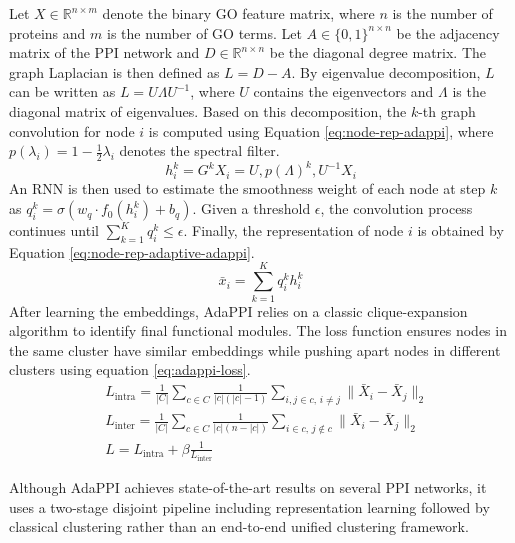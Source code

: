 Let \(X \in \mathbb{R}^{n \times m}\) denote the binary GO feature matrix, where \(n\) is the number of proteins and \(m\) is the number of GO terms. Let \(A \in \{0,1\}^{n \times n}\) be the adjacency matrix of the PPI network and \(D \in \mathbb{R}^{n \times n}\) be the diagonal degree matrix. The graph Laplacian is then defined as \(L = D - A\). By eigenvalue decomposition, \(L\) can be written as \(L = U \Lambda U^{-1}\), where \(U\) contains the eigenvectors and \(\Lambda\) is the diagonal matrix of eigenvalues. Based on this decomposition, the \(k\)-th graph convolution for node \(i\) is computed using Equation \ref{eq:node-rep-adappi}, where $p(\lambda_i) =1-\frac{1}{2}\lambda_i$ denotes the spectral filter.
\begin{equation}
	h_i^k = G^k X_i = U, p(\Lambda)^k, U^{-1} X_i
	\label{eq:node-rep-adappi}
\end{equation}
 An RNN is then used to estimate the smoothness weight of each node at step \(k\) as \(q_i^k = \sigma\!\left(w_q \cdot f_0(h_i^k) + b_q\right)\). Given a threshold \(\epsilon\), the convolution process continues until \(\sum_{k=1}^{K} q_i^k \leq \epsilon\). Finally, the representation of node \(i\) is obtained by Equation \ref{eq:node-rep-adaptive-adappi}. 
 \begin{equation}
 	\bar{x}_i = \sum_{k=1}^{K} q_i^k h_i^k
 	\label{eq:node-rep-adaptive-adappi}
 \end{equation}
After learning the embeddings, AdaPPI relies on a classic clique-expansion algorithm to identify final functional modules. The loss function ensures nodes in the same cluster have similar embeddings while pushing apart nodes in different clusters using equation \ref{eq:adappi-loss}.
\begin{equation}
	\begin{aligned}
		& L_{\text{intra}} = \frac{1}{|C|} \sum_{c \in C} \frac{1}{|c|(|c|-1)} \sum_{i,j \in c,\, i \neq j} \lVert \bar{X}_i - \bar{X}_j \rVert_2 \\
		& L_{\text{inter}} = \frac{1}{|C|} \sum_{c \in C} \frac{1}{|c|(n-|c|)} \sum_{i \in c,\, j \notin c} \lVert \bar{X}_i - \bar{X}_j \rVert_2 \\
		& L = L_{\text{intra}} + \beta \frac{1}{L_{\text{inter}}}
	\end{aligned}
	\label{eq:adappi-loss}
\end{equation}

Although AdaPPI achieves state-of-the-art results on several PPI networks, it uses a two-stage disjoint pipeline including representation learning followed by classical clustering rather than an end-to-end unified clustering framework.